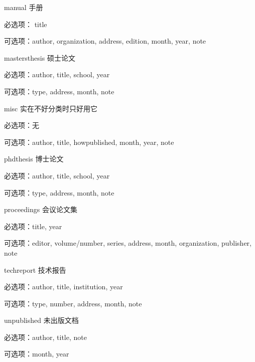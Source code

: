 \begin{compactdesc}
\begin{compactitem}
        \end{compactitem}
    \item [manual] 手册
        \begin{compactitem}
            \item 必选项： title
            \item 可选项：author, organization, address, edition, month, year, note
        \end{compactitem}
    \item [mastersthesis] 硕士论文
        \begin{compactitem}
            \item 必选项：author, title, school, year
            \item 可选项：type, address, month, note
        \end{compactitem}
    \item [misc] 实在不好分类时只好用它
        \begin{compactitem}
            \item 必选项：无
            \item 可选项：author, title, howpublished, month, year, note
        \end{compactitem}
    \item [phdthesis] 博士论文
        \begin{compactitem}
            \item 必选项：author, title, school, year
            \item 可选项：type, address, month, note
        \end{compactitem}
    \item [proceedings] 会议论文集
        \begin{compactitem}
            \item 必选项：title, year
            \item 可选项：editor, volume/number, series, address, month, organization, publisher, note
        \end{compactitem}
    \item [techreport] 技术报告
        \begin{compactitem}
            \item 必选项：author, title, institution, year
            \item 可选项：type, number, address, month, note
        \end{compactitem}
    \item [unpublished] 未出版文档
        \begin{compactitem}
            \item 必选项：author, title, note
            \item 可选项：month, year
        \end{compactitem}
\end{compactdesc}

